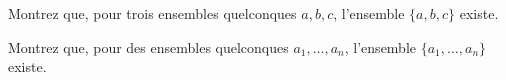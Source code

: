 \documentclass[../../../include/open-logic-section]{subfiles}
\begin{document}
\begin{prob}
Montrez que, pour trois ensembles quelconques $a, b, c$, l'ensemble
$\{a, b, c\}$ existe.
\end{prob}

\begin{prob}
Montrez que, pour des ensembles quelconques $a_1, \ldots, a_n$, l'ensemble
$\{a_1, \ldots, a_n\}$ existe.
\end{prob}

\end{document}
